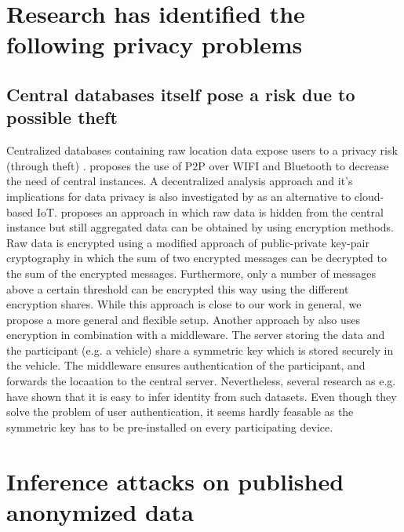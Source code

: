 
\section{Research has identified the following privacy problems}
\subsection{Central databases itself pose a risk due to possible theft}
Centralized databases containing raw location data expose users to a privacy risk (through theft) \parencite{iot, hoh2006enhancing}. \parencite{p2p-android} proposes the use of P2P over WIFI and Bluetooth to decrease the need of central instances. A decentralized analysis approach and it's implications for data privacy is also investigated by \parencite{iot} as an alternative to cloud-based IoT.
\parencite{crowdsourcing} proposes an approach in which raw data is hidden from the central instance but still aggregated data can be obtained by using encryption methods. Raw data is encrypted using a modified approach of public-private key-pair cryptography in which the sum of two encrypted messages can be decrypted to the sum of the encrypted messages. Furthermore, only a number of messages above a certain threshold can be encrypted this way using the different encryption shares. While this approach is close to our work in general, we propose a more general and flexible setup.
Another approach by \parencite{hoh2006enhancing} also uses encryption in combination with a middleware. The server storing the data and the participant (e.g. a vehicle) share a symmetric key which is stored securely in the vehicle. The middleware ensures authentication of the participant, and forwards the locaation to the central server. Nevertheless, several research as e.g. \parencite{krumm, twitter, cellphone} have shown that it is easy to infer identity from such datasets. Even though they solve the problem of user authentication, it seems hardly feasable as the symmetric key has to be pre-installed on every participating device.

\section{Inference attacks on published anonymized data}
